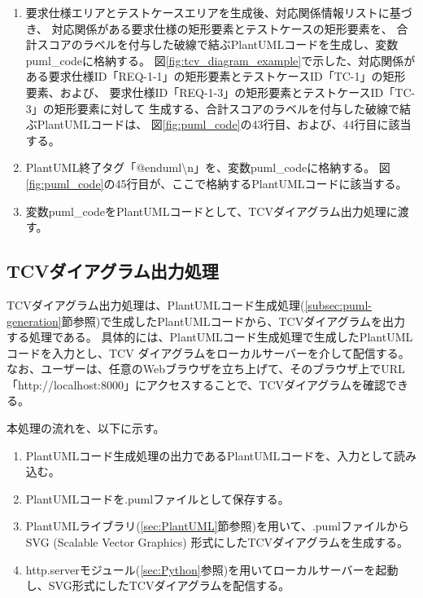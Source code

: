 \begin{enumerate}
\begin{enumerate}
\begin{enumerate}
\begin{enumerate}
                図\ref{fig:puml_code}の38行目に該当する。
            \end{enumerate}
            \item テストスイートエリアの終了タグ「\}」を、変数puml\_codeに格納する。
        \end{enumerate}
        \item テストケースエリアの終了タグ「\}」を、変数puml\_codeに格納する。
    \end{enumerate}
    \item 要求仕様エリアとテストケースエリアを生成後、対応関係情報リストに基づき、
    対応関係がある要求仕様の矩形要素とテストケースの矩形要素を、
    合計スコアのラベルを付与した破線で結ぶPlantUMLコードを生成し、変数puml\_codeに格納する。
    図\ref{fig:tcv_diagram_example}で示した、対応関係がある要求仕様ID「REQ-1-1」の矩形要素とテストケースID「TC-1」の矩形要素、および、
    要求仕様ID「REQ-1-3」の矩形要素とテストケースID「TC-3」の矩形要素に対して
    生成する、合計スコアのラベルを付与した破線で結ぶPlantUMLコードは、
    図\ref{fig:puml_code}の43行目、および、44行目に該当する。
    \item PlantUML終了タグ「@enduml\textbackslash n」を、変数puml\_codeに格納する。
    図\ref{fig:puml_code}の45行目が、ここで格納するPlantUMLコードに該当する。
    \item 変数puml\_codeをPlantUMLコードとして、TCVダイアグラム出力処理に渡す。
\end{enumerate}

\subsection{TCVダイアグラム出力処理}\label{subsec:diagram-generation-process}
TCVダイアグラム出力処理は、PlantUMLコード生成処理(\ref{subsec:puml-generation}節参照)で生成したPlantUMLコードから、TCVダイアグラムを出力する処理である。
具体的には、PlantUMLコード生成処理で生成したPlantUML コードを入力とし、TCV ダイアグラムをローカルサーバーを介して配信する。
なお、ユーザーは、任意のWebブラウザを立ち上げて、そのブラウザ上でURL「http://localhost:8000」にアクセスすることで、TCVダイアグラムを確認できる。

本処理の流れを、以下に示す。
\begin{enumerate}
    \item PlantUMLコード生成処理の出力であるPlantUMLコードを、入力として読み込む。
    \item PlantUMLコードを.pumlファイルとして保存する。
    \item PlantUMLライブラリ(\ref{sec:PlantUML}節参照)を用いて、.pumlファイルからSVG (Scalable Vector Graphics) 形式にしたTCVダイアグラムを生成する。
    \item http.serverモジュール(\cref{sec:Python}参照)を用いてローカルサーバーを起動し、SVG形式にしたTCVダイアグラムを配信する。
\end{enumerate}